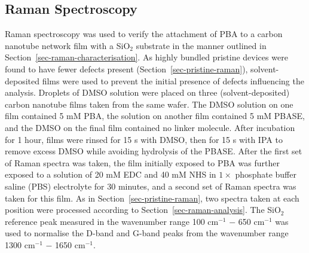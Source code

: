 \documentclass[
  a4paper,
]{scrbook}
\begin{document}
\hypertarget{raman-spectroscopy}{%
\subsection{Raman Spectroscopy}\label{raman-spectroscopy}}

Raman spectroscopy was used to verify the attachment of PBA to a carbon
nanotube network film with a SiO\(_2\) substrate in the manner outlined
in Section~\ref{sec-raman-characterisation}. As highly bundled pristine
devices were found to have fewer defects present
(Section~\ref{sec-pristine-raman}), solvent-deposited films were used to
prevent the initial presence of defects influencing the analysis.
Droplets of DMSO solution were placed on three (solvent-deposited)
carbon nanotube films taken from the same wafer. The DMSO solution on
one film contained 5 mM PBA, the solution on another film contained 5 mM
PBASE, and the DMSO on the final film contained no linker molecule.
After incubation for 1 hour, films were rinsed for 15 s with DMSO, then
for 15 s with IPA to remove excess DMSO while avoiding hydrolysis of the
PBASE. After the first set of Raman spectra was taken, the film
initially exposed to PBA was further exposed to a solution of 20 mM EDC
and 40 mM NHS in \(1 \times\) phosphate buffer saline (PBS) electrolyte
for 30 minutes, and a second set of Raman spectra was taken for this
film. As in Section~\ref{sec-pristine-raman}, two spectra taken at each
position were processed according to Section~\ref{sec-raman-analysis}.
The SiO\(_2\) reference peak measured in the wavenumber range 100
cm\(^{-1}\) \(-\) 650 cm\(^{-1}\) was used to normalise the D-band and
G-band peaks from the wavenumber range 1300 cm\(^{-1}\) \(-\) 1650
cm\(^{-1}\).
\end{document}
